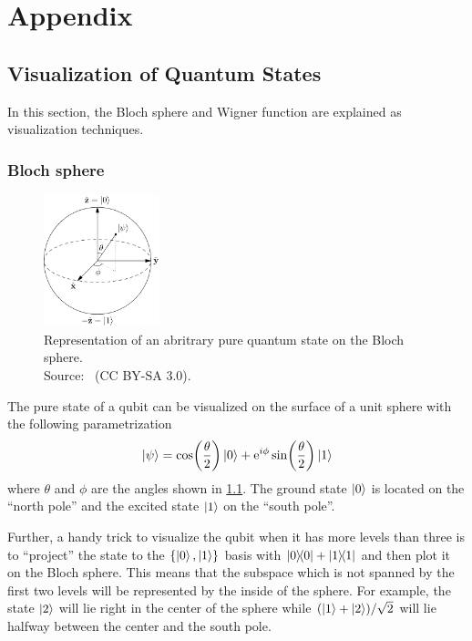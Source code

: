 \documentclass[main.tex]{subfiles}
\begin{document}
\chapter{Appendix}
\section{Visualization of Quantum States}
In this section, the Bloch sphere and Wigner function are explained as visualization techniques.

\subsection{Bloch sphere}
\begin{figure}[H]
    \centering
    \includegraphics[width=0.3\textwidth]{figs/bloch_sphere.png}
    \caption{Representation of an abritrary pure quantum state on the Bloch sphere.
    \\ Source:~\cite{glosser.ca_english:_2012} (CC BY-SA 3.0).
    }%
    \label{fig:bloch_sphere}
\end{figure}

The pure state of a qubit can be visualized on the surface of a unit sphere with the following parametrization
\begin{equation}
    \ket{\psi} = \cos(\frac{\theta}{2})\ket{0} + \mathrm{e}^{i\phi}\sin(\frac{\theta}{2})\ket{1}
\end{equation}
where \( \theta \) and \( \phi \) are the angles shown in \cref{fig:bloch_sphere}.
The ground state \(\ket{0}\) is located on the ``north pole'' and the excited state \(\ket{1}\) on the ``south pole''.

Further, a handy trick to visualize the qubit when it has more levels than three is to ``project'' the state to the \(\qty{\ket{0},\ket{1}}\) basis with \( \op{0} + \op{1} \) and then plot it on the Bloch sphere.
This means that the subspace which is not spanned by the first two levels will be represented by the inside of the sphere.
For example, the state \(\ket{2}\) will lie right in the center of the sphere while \(\qty(\ket{1}+\ket{2})/\sqrt{2}\) will lie halfway between the center and the south pole.
\end{document}
